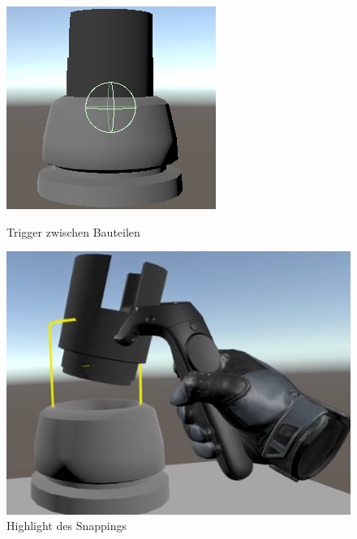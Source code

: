 \begin{figure}[h!]
	\centering
	\begin{minipage}[b]{0.49\linewidth}
		\centering
		\includegraphics[keepaspectratio,width=0.9\linewidth]{img/Trigger_Between_Objects.PNG}
		\caption{Trigger zwischen Bauteilen}
		\label{fig:trigger_between_objects}
	\end{minipage}
	\hfill
	\begin{minipage}[b]{0.49\linewidth}
		\centering
		\includegraphics[keepaspectratio,width=0.9\linewidth]{img/Snapping.PNG}
		\caption{Highlight des Snappings}
		\label{fig:snapping}
	\end{minipage}
\end{figure}

